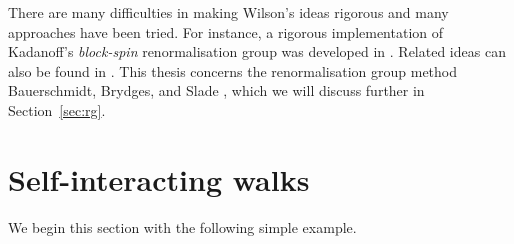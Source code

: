 There are many difficulties in making Wilson's ideas rigorous and many approaches
have been tried. For instance, a rigorous implementation of Kadanoff's \emph{block-spin}
renormalisation group was developed in \cite{GK85}. Related ideas can also be found in
\cite{GJ87,FMRS87}. This thesis concerns the renormalisation group method Bauerschmidt,
Brydges, and Slade \cite{BS-rg-norm,BS-rg-loc,BBS-rg-pt,BS-rg-IE,BS-rg-step}, which we
will discuss further in Section~\ref{sec:rg}.

\begin{example}
\end{example}



\section{Self-interacting walks}
\label{sec:walks}




We begin this section with the following simple example.

